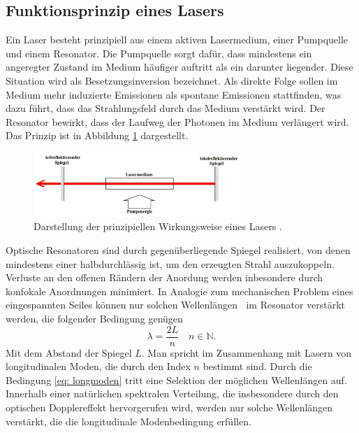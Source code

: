 \subsection{Funktionsprinzip eines Lasers}
Ein Laser besteht prinzipiell aus einem aktiven Lasermedium, einer Pumpquelle und einem Resonator. Die Pumpquelle sorgt dafür, dass
mindestens ein angeregter Zustand im Medium häufiger auftritt als ein darunter liegender. Diese Situation wird als Besetzungsinversion bezeichnet. Als direkte
Folge sollen im Medium mehr induzierte Emissionen als spontane Emissionen stattfinden, was dazu führt, dass das Strahlungsfeld durch das Medium verstärkt wird.
Der Resonator bewirkt, dass der Laufweg der Photonen im Medium verlängert wird. Das Prinzip ist in Abbildung \ref{fig: prinzip_laser} dargestellt.
\begin{figure}
  \centering
  \includegraphics[width = 0.7\textwidth]{theorie_bilder/prinzip_laser.png}
  \caption{Darstellung der prinzipiellen Wirkungsweise eines Lasers \cite{anleitung61}.} %
  \label{fig: prinzip_laser}
\end{figure}

Optische Resonatoren sind durch gegenüberliegende Spiegel realisiert, von denen mindestens einer halbdurchlässig ist, um den erzeugten Strahl
auszukoppeln. Verluste an den offenen Rändern der Anordung werden inbesondere durch konfokale Anordnungen minimiert.
In Analogie zum mechanischen Problem eines eingespannten Seiles können nur solchen Wellenlängen $\
$ im Resonator verstärkt werden, die %
folgender Bedingung genügen
\begin{equation}
  \lambda = \frac{2 L }{n} \quad n \in  \mathbb{N}.
  \label{eq: longmoden}
\end{equation}
Mit dem Abstand der Spiegel $L$. Man spricht im Zusammenhang mit Lasern von longitudinalen Moden, die durch den Index $n$ bestimmt sind.
Durch die Bedingung \eqref{eq: longmoden} tritt eine Selektion der möglichen Wellenlängen auf. Innerhalb
einer natürlichen spektralen Verteilung, die insbesondere durch den optischen Dopplereffekt hervorgerufen wird, werden nur solche Wellenlängen
verstärkt, die die longitudinale Modenbedingung erfüllen.

